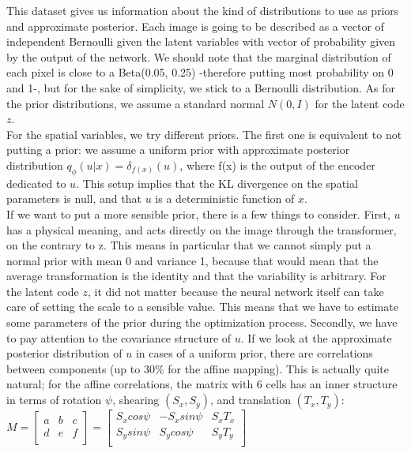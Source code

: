 \documentclass[letterpaper, twoside]{article}
\begin{document}
This dataset gives us information about the kind of distributions to use as priors and approximate posterior. Each image is going to be described as a vector of independent Bernoulli given the latent variables with vector of probability given by the output of the network. We should note that the marginal distribution of each pixel is close to a Beta(0.05, 0.25) -therefore putting most probability on 0 and 1-, but for the sake of simplicity, we stick to a Bernoulli distribution. As for the prior distributions, we assume a standard normal $N(0, I)$ for the latent code $z$. \\

For the spatial variables, we try different priors. The first one is equivalent to not putting a prior: we assume a uniform prior with approximate posterior distribution $q_\phi(u|x) = \delta_{f(x)}(u)$, where f(x) is the output of the encoder dedicated to $u$. This setup implies that the KL divergence on the spatial parameters is null, and that $u$ is a deterministic function of $x$.\\
If we want to put a more sensible prior, there is a few things to consider. First, $u$ has a physical meaning, and acts directly on the image through the transformer, on the contrary to z. This means in particular that we cannot simply put a normal prior with mean 0 and variance 1, because that would mean that the average transformation is the identity and that the variability is arbitrary. For the latent code $z$, it did not matter because the neural network itself can take care of setting the scale to a sensible value. This means that we have to estimate some parameters of the prior during the optimization process. Secondly, we have to pay attention to the covariance structure of $u$. If we look at the approximate posterior distribution of $u$ in cases of a uniform prior, there are correlations between components (up to 30\% for the affine mapping). This is actually quite natural; for the affine correlations, the matrix with 6 cells has an inner structure in terms of rotation $\psi$, shearing $(S_x, S_y)$, and translation $(T_x, T_y)$:\\

$M=
  \left[ {\begin{array}{ccc}
   a & b & c\\
   d & e & f\\
  \end{array} } \right]
 = 
  \left[ {\begin{array}{ccc}
   S_x cos \psi & -S_x sin \psi & S_x T_x\\
   S_y sin \psi & S_y cos \psi & S_y T_y\\
  \end{array} } \right]$
\end{document}
